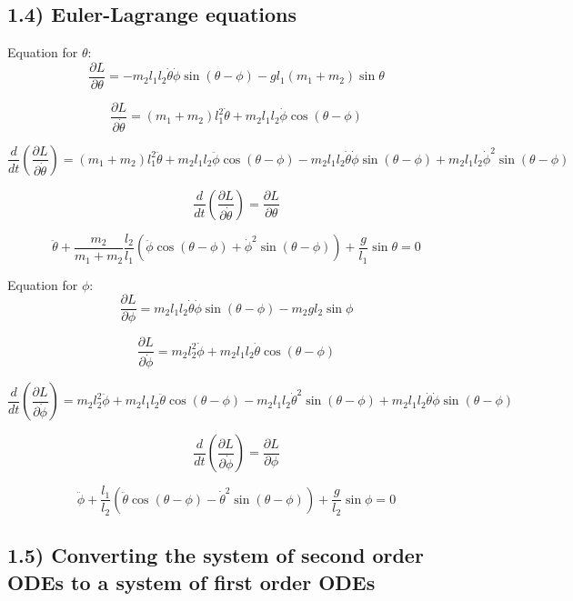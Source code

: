 \documentclass[12pt]{article}
\begin{document}
\subsection*{1.4) Euler-Lagrange equations}

Equation for $\theta$:
\[
\frac{\partial L}{\partial\theta}
=-m_2l_1l_2\dot{\theta}\dot{\phi}\sin(\theta-\phi)
-gl_1(m_1+m_2)\sin\theta
\]

\[
\frac{\partial L}{\partial\dot{\theta}}
=(m_1+m_2)l_1^2\dot{\theta}
+m_2l_1l_2\dot{\phi}\cos(\theta-\phi)
\]

\[
\frac{d}{dt}\left(\frac{\partial L}{\partial\dot{\theta}}\right)
=(m_1+m_2)l_1^2\ddot{\theta}
+m_2l_1l_2\ddot{\phi}\cos(\theta-\phi)
-m_2l_1l_2\dot{\theta}\dot{\phi}\sin(\theta-\phi)
+m_2l_1l_2\dot{\phi}^2\sin(\theta-\phi)
\]

\[
\frac{d}{dt}\left(\frac{\partial L}{\partial\dot{\theta}}\right)
=\frac{\partial L}{\partial\theta}
\]

\begin{equation}
\ddot{\theta}
+\frac{m_2}{m_1+m_2}\frac{l_2}{l_1}
\left(\ddot{\phi}\cos(\theta-\phi)
+\dot{\phi}^2\sin(\theta-\phi)\right)
+\frac{g}{l_1}\sin\theta=0
\tag{1}
\end{equation}

Equation for $\phi$:
\[
\frac{\partial L}{\partial\phi}
=m_2l_1l_2\dot{\theta}\dot{\phi}\sin(\theta-\phi)
-m_2gl_2\sin\phi
\]

\[
\frac{\partial L}{\partial\dot{\phi}}
=m_2l_2^2\dot{\phi}
+m_2l_1l_2\dot{\theta}\cos(\theta-\phi)
\]

\[
\frac{d}{dt}\left(\frac{\partial L}{\partial\dot{\phi}}\right)
=m_2l_2^2\ddot{\phi}
+m_2l_1l_2\ddot{\theta}\cos(\theta-\phi)
-m_2l_1l_2\dot{\theta}^2\sin(\theta-\phi)
+m_2l_1l_2\dot{\theta}\dot{\phi}\sin(\theta-\phi)
\]

\[
\frac{d}{dt}\left(\frac{\partial L}{\partial\dot{\phi}}\right)
=\frac{\partial L}{\partial\phi}
\]

\begin{equation}
\ddot{\phi}
+\frac{l_1}{l_2}
\left(\ddot{\theta}\cos(\theta-\phi)
-\dot{\theta}^2\sin(\theta-\phi)\right)
+\frac{g}{l_2}\sin\phi=0
\tag{2}
\end{equation}

\subsection*{1.5) Converting the system of second order ODEs to a system of first order ODEs}
\end{document}
